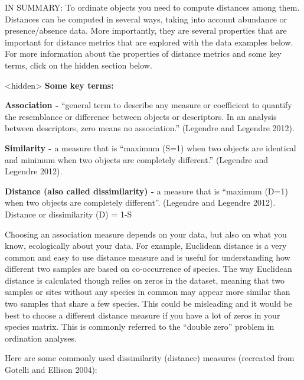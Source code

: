 \documentclass[
]{book}
\begin{document}
IN SUMMARY: To ordinate objects you need to compute distances among
them. Distances can be computed in several ways, taking into account
abundance or presence/absence data. More importantly, they are several
properties that are important for distance metrics that are explored
with the data examples below. For more information about the properties
of distance metrics and some key terms, click on the hidden section
below.

\textless hidden\textgreater{} \textbf{Some key terms:}

\textbf{Association -} ``general term to describe any measure or coefficient
to quantify the resemblance or difference between objects or
descriptors. In an analysis between descriptors, zero means no
association.'' (Legendre and Legendre 2012).

\textbf{Similarity -} a measure that is ``maximum (S=1) when two objects are
identical and minimum when two objects are completely different.''
(Legendre and Legendre 2012).

\textbf{Distance (also called dissimilarity) -} a measure that is ``maximum
(D=1) when two objects are completely different''. (Legendre and Legendre
2012). Distance or dissimilarity (D) = 1-S

Choosing an association measure depends on your data, but also on what
you know, ecologically about your data. For example, Euclidean distance
is a very common and easy to use distance measure and is useful for
understanding how different two samples are based on co-occurrence of
species. The way Euclidean distance is calculated though relies on zeros
in the dataset, meaning that two samples or sites without any species in
common may appear more similar than two samples that share a few
species. This could be misleading and it would be best to choose a
different distance measure if you have a lot of zeros in your species
matrix. This is commonly referred to the ``double zero'' problem in
ordination analyses.

Here are some commonly used dissimilarity (distance) measures (recreated
from Gotelli and Ellison 2004):
\end{document}
